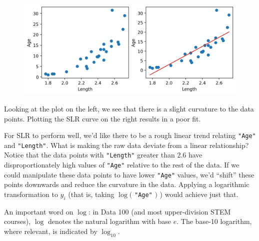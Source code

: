 \documentclass[
  letterpaper,
  DIV=11,
  numbers=noendperiod]{scrreprt}
\begin{document}
\begin{figure}[H]

{\centering \includegraphics{constant_model_loss_transformations/loss_transformations_files/figure-pdf/cell-6-output-1.png}

}

\end{figure}

Looking at the plot on the left, we see that there is a slight curvature
to the data points. Plotting the SLR curve on the right results in a
poor fit.

For SLR to perform well, we'd like there to be a rough linear trend
relating \texttt{"Age"} and \texttt{"Length"}. What is making the raw
data deviate from a linear relationship? Notice that the data points
with \texttt{"Length"} greater than 2.6 have disproportionately high
values of \texttt{"Age"} relative to the rest of the data. If we could
manipulate these data points to have lower \texttt{"Age"} values, we'd
``shift'' these points downwards and reduce the curvature in the data.
Applying a logarithmic transformation to \(y_i\) (that is, taking
\(\log(\) \texttt{"Age"} \()\) ) would achieve just that.

An important word on \(\log\): in Data 100 (and most upper-division STEM
courses), \(\log\) denotes the natural logarithm with base \(e\). The
base-10 logarithm, where relevant, is indicated by \(\log_{10}\).
\end{document}
